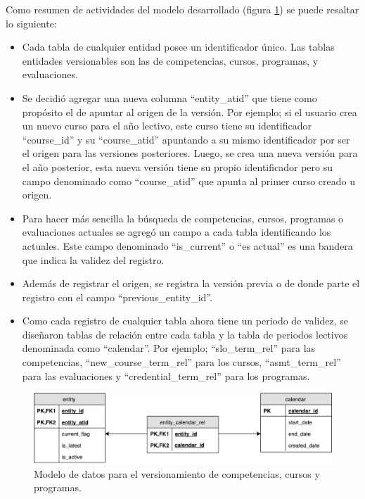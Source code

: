 Como resumen de actividades del modelo desarrollado (figura \ref{version_model}) se puede resaltar lo siguiente:
\begin{itemize}
	\item Cada tabla de cualquier entidad posee un identificador único. Las tablas entidades versionables son las de competencias, cursos, programas, y evaluaciones.
	\item Se decidió agregar una nueva columna \enquote{entity_atid} que tiene como propósito el de apuntar al origen de la versión. Por ejemplo; si el usuario crea un nuevo curso para el año lectivo, este curso tiene su identificador \enquote{course_id} y su \enquote{course_atid} apuntando a su mismo identificador por ser el origen para las versiones posteriores. Luego, se crea una nueva versión para el año posterior, esta nueva versión tiene su propio identificador pero su campo denominado como \enquote{course_atid} que apunta al primer curso creado u origen.
	\item Para hacer más sencilla la búsqueda de competencias, cursos, programas o evaluaciones actuales se agregó un campo a cada tabla identificando los actuales. Este campo denominado \enquote{is_current} o “es actual” es una bandera que indica la validez del registro.
	\item Además de registrar el origen, se registra la versión previa o de donde parte el registro con el campo \enquote{previous_entity_id}.
	\item Como cada registro de cualquier tabla ahora tiene un periodo de validez, se diseñaron tablas de relación entre cada tabla y la tabla de periodos lectivos denominada como \enquote{calendar}. Por ejemplo; \enquote{slo_term_rel} para las competencias, \enquote{new_course_term_rel} para los cursos, \enquote{asmt_term_rel} para las evaluaciones y \enquote{credential_term_rel} para los programas.
\end{itemize}

\begin{figure}
\centering
\includegraphics[width=125mm,scale=1]{Capitulos/DesarrollodelaAplicacion/Imagenes/version_model}
\caption{Modelo de datos para el versionamiento de competencias, cursos y programas.}
  \label{version_model}
\end{figure}